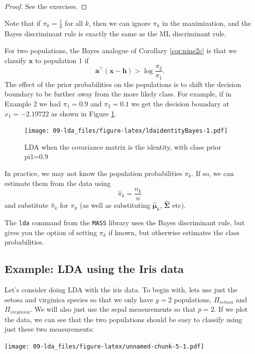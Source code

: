 \documentclass[
]{book}
\theoremstyle{definition}
\theoremstyle{definition}
\theoremstyle{definition}
\theoremstyle{definition}
\theoremstyle{remark}
\begin{document}
\begin{proof}
See the exercises.
\end{proof}

Note that if \(\pi_k=\frac{1}{g}\) for all \(k\), then we can ignore \(\pi_k\) in the maximization, and the Bayes discriminant rule is exactly the same as the ML discriminant rule.

For two populations, the Bayes analogue of Corollary \ref{cor:nine2c} is that we classify \(\mathbf x\) to population 1 if
\[\mathbf a^\top(\mathbf x-\mathbf h)> \log\frac{\pi_2}{\pi_1}.\]
The effect of the prior probabilities on the populations is to shift the decision boundary to be further away from the more likely class. For example, if in Example 2 we had \(\pi_1 = 0.9\) and \(\pi_2=0.1\) we get the decision boundary at \(x_1 = -2.19722\) as shown in Figure \ref{fig:ldaidentityBayes}.

\begin{figure}
\centering
\texttt{[image: 09-lda\_files/figure-latex/ldaidentityBayes-1.pdf]}
\caption{\label{fig:ldaidentityBayes}LDA when the covariance matrix is the identity, with class prior pi1=0.9}
\end{figure}

In practice, we may not know the population probabilities \(\pi_k\). If so, we can estimate them from the data using
\[\hat{\pi}_k = \frac{n_k}{n}\]
and substitute \(\hat{\pi}_k\) for \(\pi_k\) (as well as substituting \(\hat{{\boldsymbol{\mu}}}_k\), \(\widehat{\boldsymbol{\Sigma}}\) etc).

The \texttt{lda} command from the \texttt{MASS} library uses the Bayes discriminant rule, but gives you the option of setting \(\pi_k\) if known, but otherwise estimates the class probabilities.

\subsection{Example: LDA using the Iris data}\label{example-lda-using-the-iris-data}

Let's consider doing LDA with the iris data. To begin with, lets use just the setosa and virginica species so that we only have \(g=2\) populations, \(\Pi_{setosa}\) and \(\Pi_{virginica}\). We will also just use the sepal measurements so that \(p=2\). If we plot the data, we can see that the two populations should be easy to classify using just these two measurements:

\texttt{[image: 09-lda\_files/figure-latex/unnamed-chunk-5-1.pdf]}
\end{document}
